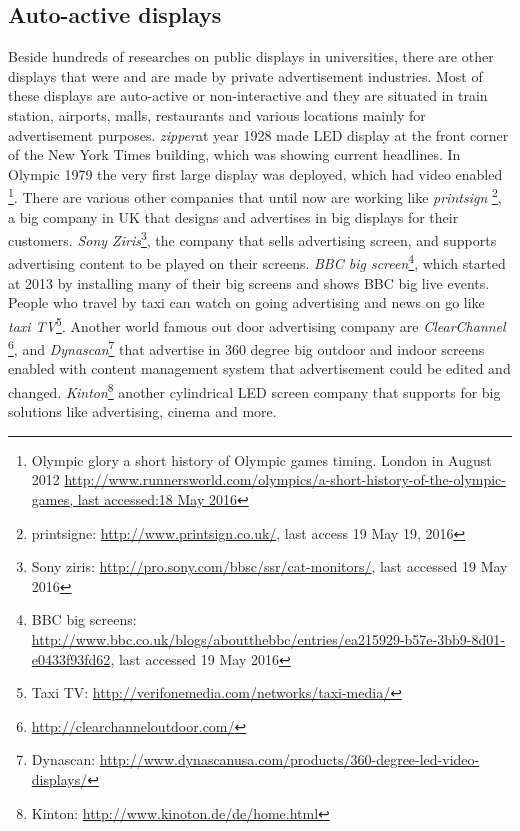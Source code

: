 \subsection{Auto-active displays}
Beside hundreds of researches on public displays in universities, there are other displays that were and are made by private advertisement industries. Most of these displays are auto-active or non-interactive and they are situated in train station, airports, malls, restaurants and various locations mainly for advertisement purposes. \emph{zipper}\cite{zipper}at year 1928 made LED display at the front corner of the New York Times building, which was showing current headlines. In Olympic 1979 the very first large display was deployed, which had video enabled \footnote{Olympic glory a short history of Olympic games timing. London in August 2012 \url{http://www.runnersworld.com/olympics/a-short-history-of-the-olympic-games, last accessed:18 May 2016}}. There are various other companies that until now are working like \emph{printsign} \footnote{printsigne: \url{http://www.printsign.co.uk/}, last access 19 May 19, 2016}, a big company in UK that designs and advertises in big displays for their customers. \emph{Sony Ziris}\footnote{Sony ziris: \url{http://pro.sony.com/bbsc/ssr/cat-monitors/}, last accessed 19 May 2016}, the company that sells advertising screen, and supports advertising content to be played on their screens. \emph{BBC big screen}\footnote{BBC big screens: \url{http://www.bbc.co.uk/blogs/aboutthebbc/entries/ea215929-b57e-3bb9-8d01-e0433f93fd62}, last accessed 19 May 2016}, which started at 2013 by installing many of their big screens and shows BBC big live events. People who travel by taxi can watch on going advertising and news on go like \emph{taxi TV}\footnote{Taxi TV: \url{http://verifonemedia.com/networks/taxi-media/}}. Another world famous out door advertising company are \emph{ClearChannel} \footnote{\url{http://clearchanneloutdoor.com/}}, and  \emph{Dynascan}\footnote{ Dynascan: \url{http://www.dynascanusa.com/products/360-degree-led-video-displays/}}  that advertise in 360 degree big outdoor and indoor screens enabled with content management system that advertisement could be edited and changed.  \emph{Kinton}\footnote{Kinton: \url{http://www.kinoton.de/de/home.html}} another cylindrical LED screen company that supports for big solutions like advertising, cinema and more.


